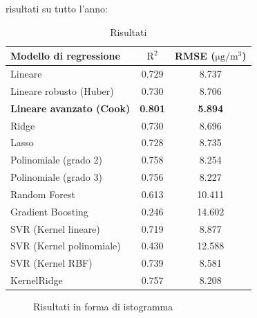 risultati su tutto l’anno:
\begin{table}[H]
    \footnotesize
    \centering
    \begin{tabular}{|l|c|c|}
    \hline
        \textbf{Modello di regressione} & $\bm{\mathrm{R^2}}$ & \textbf{RMSE (}$\mathrm{\si{\micro}g/m^3}$) \\ \hline
        Lineare & 0.729 & 8.737 \\ \hline
        Lineare robusto (Huber) & 0.730 & 8.706 \\ \hline
        \textbf{Lineare avanzato (Cook)} & \textbf{0.801} & \textbf{5.894} \\ \hline
        Ridge & 0.730 & 8.696 \\ \hline
        Lasso & 0.728 & 8.735 \\ \hline
        Polinomiale (grado 2) & 0.758 & 8.254 \\ \hline
        Polinomiale (grado 3) & 0.756 & 8.227 \\ \hline
        Random Forest & 0.613 & 10.411 \\ \hline
        Gradient Boosting & 0.246 & 14.602 \\ \hline
        SVR (Kernel lineare) & 0.719 & 8.877 \\ \hline
        SVR (Kernel polinomiale) & 0.430 & 12.588 \\ \hline
        SVR (Kernel RBF) & 0.739 & 8.581 \\ \hline
        KernelRidge & 0.757 & 8.208 \\ \hline
    \end{tabular}
    \caption{Risultati}
    \label{fig:risultati-pm2.5}
\end{table}

\begin{figure}[H]%
    \centering
    \captionsetup{justification=centering}
    \caption{Risultati in forma di istogramma}%
    \label{fig:risultati-pm2.5-hist}%
\end{figure}

